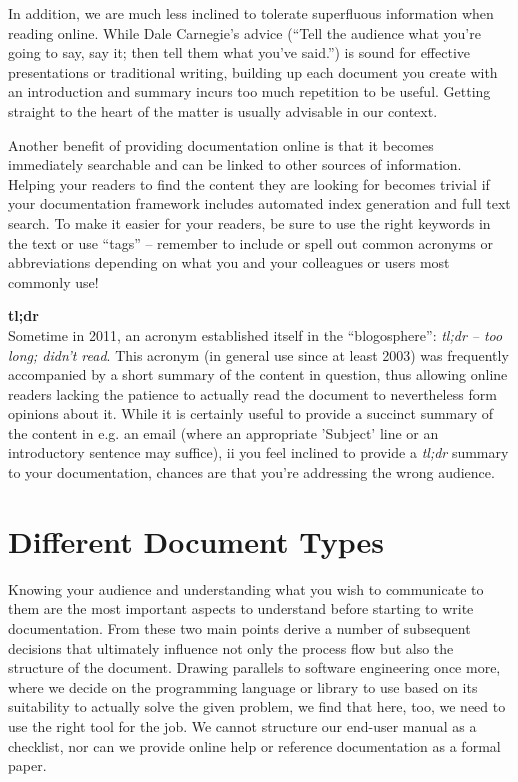In addition, we are much less inclined to tolerate
superfluous information when reading online.  While
Dale Carnegie's advice
(``Tell the audience what you're going to say, say it;
then tell them what you've said.'') is sound for
effective presentations or traditional writing,
building up each document you create with an
introduction and summary incurs too much repetition to
be useful.  Getting straight to the heart of the
matter is usually advisable in our context.

Another benefit of providing documentation online is
that it becomes immediately searchable and can be
linked to other sources of information.  Helping your
readers to find the content they are looking for
becomes trivial if your documentation framework
includes automated index generation and full text
search.  To make it easier for your readers, be sure
to use the right keywords in the text or use ``tags''
-- remember to include or spell out common acronyms or
abbreviations depending on what you and your
colleagues or users most commonly use!

\begin{sidenote}
{\bf tl;dr} \\
Sometime in 2011, an acronym established itself in the
``blogosphere'': {\em tl;dr -- too long; didn't read}.
This acronym (in general use since at least 2003)  was
frequently accompanied by a short summary of the
content in question, thus allowing online readers
lacking the patience to actually read the document to
nevertheless form opinions about it.  While it is
certainly useful to provide a succinct summary of the
content in e.g. an email (where an appropriate
'Subject' line or an introductory sentence may
suffice), ii you feel inclined to provide a {\em
tl;dr} summary to your documentation,
chances are that you're addressing the wrong
audience.
\end{sidenote}


\section{Different Document Types}
\label{documentation:types}

Knowing your audience and understanding what you wish
to communicate to them are the most important aspects
to understand before starting to write documentation.
From these two main points derive a number of
subsequent decisions that ultimately influence not
only the process flow but also the structure of the
document.  Drawing parallels to software engineering
once more, where we decide on the programming language
or library to use based on its suitability to actually
solve the given problem, we find that here, too, we
need to use the right tool for the job.  We cannot
structure our end-user manual as a checklist, nor can
we provide online help or reference documentation as a
formal paper.

